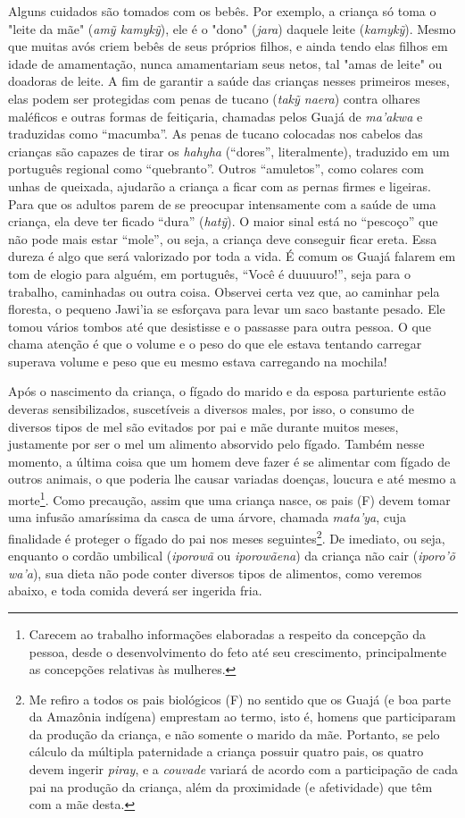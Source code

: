 Alguns cuidados são tomados com os bebês. Por exemplo, a criança só toma
o "leite da mãe" (\emph{amỹ kamykỹ}), ele é o "dono" (\emph{jara})
daquele leite (\emph{kamykỹ}). Mesmo que muitas avós criem bebês de seus
próprios filhos, e ainda tendo elas filhos em idade de amamentação,
nunca amamentariam seus netos, tal "amas de leite" ou doadoras de leite.
A fim de garantir a saúde das crianças nesses primeiros meses, elas
podem ser protegidas com penas de tucano (\emph{takỹ naera}) contra
olhares maléficos e outras formas de feitiçaria, chamadas pelos Guajá de
\emph{ma'akwa} e traduzidas como ``macumba''. As penas de tucano
colocadas nos cabelos das crianças são capazes de tirar os \emph{hahyha}
(``dores'', literalmente), traduzido em um português regional como
``quebranto''. Outros ``amuletos'', como colares com unhas de queixada,
ajudarão a criança a ficar com as pernas firmes e ligeiras. Para que os
adultos parem de se preocupar intensamente com a saúde de uma criança,
ela deve ter ficado ``dura'' (\emph{hatỹ}). O maior sinal está no
``pescoço'' que não pode mais estar ``mole'', ou seja, a criança deve
conseguir ficar ereta. Essa dureza é algo que será valorizado por toda a
vida. É comum os Guajá falarem em tom de elogio para alguém, em
português, ``Você é duuuuro!'', seja para o trabalho, caminhadas ou
outra coisa. Observei certa vez que, ao caminhar pela floresta, o
pequeno Jawi'ia se esforçava para levar um saco bastante pesado. Ele
tomou vários tombos até que desistisse e o passasse para outra pessoa. O
que chama atenção é que o volume e o peso do que ele estava tentando
carregar superava volume e peso que eu mesmo estava carregando na
mochila!

Após o nascimento da criança, o fígado do marido e da esposa parturiente
estão deveras sensibilizados, suscetíveis a diversos males, por isso, o
consumo de diversos tipos de mel são evitados por pai e mãe durante
muitos meses, justamente por ser o mel um alimento absorvido pelo
fígado. Também nesse momento, a última coisa que um homem deve fazer é
se alimentar com fígado de outros animais, o que poderia lhe causar
variadas doenças, loucura e até mesmo a morte\footnote{Carecem ao
  trabalho informações elaboradas a respeito da concepção da pessoa,
  desde o desenvolvimento do feto até seu crescimento, principalmente as
  concepções relativas às mulheres.}. Como precaução, assim que uma
criança nasce, os pais (F) devem tomar uma infusão amaríssima da casca
de uma árvore, chamada \emph{mata'ya}, cuja finalidade é proteger o
fígado do pai nos meses seguintes\footnote{Me refiro a todos os pais
  biológicos (F) no sentido que os Guajá (e boa parte da Amazônia
  indígena) emprestam ao termo, isto é, homens que participaram da
  produção da criança, e não somente o marido da mãe. Portanto, se pelo
  cálculo da múltipla paternidade a criança possuir quatro pais, os
  quatro devem ingerir \emph{piray}, e a \emph{couvade} variará de
  acordo com a participação de cada pai na produção da criança, além da
  proximidade (e afetividade) que têm com a mãe desta.}. De imediato, ou
seja, enquanto o cordão umbilical (\emph{iporowã} ou \emph{iporowãena})
da criança não cair (\emph{iporo'õ} \emph{wa'a}), sua dieta não pode
conter diversos tipos de alimentos, como veremos abaixo, e toda comida
deverá ser ingerida fria.

